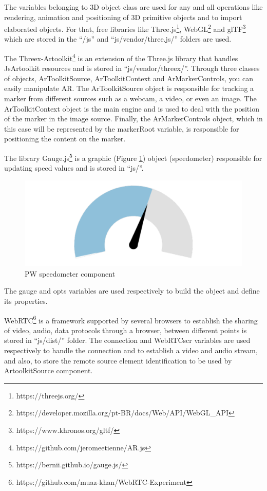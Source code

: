 The variables belonging to 3D object class are used for any and all operations like rendering, animation and positioning of 3D primitive objects and to import elaborated objects. For that, free libraries like Three.js\footnote{https://threejs.org/}, WebGL\texttrademark\footnote {https://developer.mozilla.org/pt-BR/docs/Web/API/WebGL\_API} and glTF\texttrademark\footnote{https://www.khronos.org/gltf/} which are stored in the ``/js'' and ``js/vendor/three.js/'' folders are used.

The Threex-Artoolkit\footnote{https://github.com/jeromeetienne/AR.js} is an extension of the Three.js library that handles JsArtoolkit resources and is stored in ``js/vendor/threex/''. Through three classes of objects, ArToolkitSource, ArToolkitContext and ArMarkerControls, you can easily manipulate AR. The ArToolkitSource object is responsible for tracking a marker from different sources such as a webcam, a video, or even an image. The ArToolkitContext object is the main engine and is used to deal with the position of the marker in the image source. Finally, the ArMarkerControls object, which in this case will be represented by the markerRoot variable, is responsible for positioning the content on the marker.

The library Gauge.js\footnote{https://bernii.github.io/gauge.js/} is a graphic (Figure \ref{fig:speedometerPW}) object (speedometer) responsible for updating speed values and is stored in ``js/''. 

\begin{figure}[!hbt]
\begin{center}
\includegraphics[width=0.4\linewidth]{img/cap5/speedometer}
\caption{PW speedometer component} \label{fig:speedometerPW}
\end{center}
\end{figure}

The gauge and opts variables are used respectively to build the object and define its properties.

WebRTC\footnote{https://github.com/muaz-khan/WebRTC-Experiment} is a framework supported by several browsers to establish the sharing of video, audio, data protocols through a browser, between different points is stored in ``js/dist/'' folder. The connection and WebRTCscr variables are used respectively to handle the connection and to establish a video and audio stream, and also, to store the remote source element identification to be used by ArtoolkitSource component.


